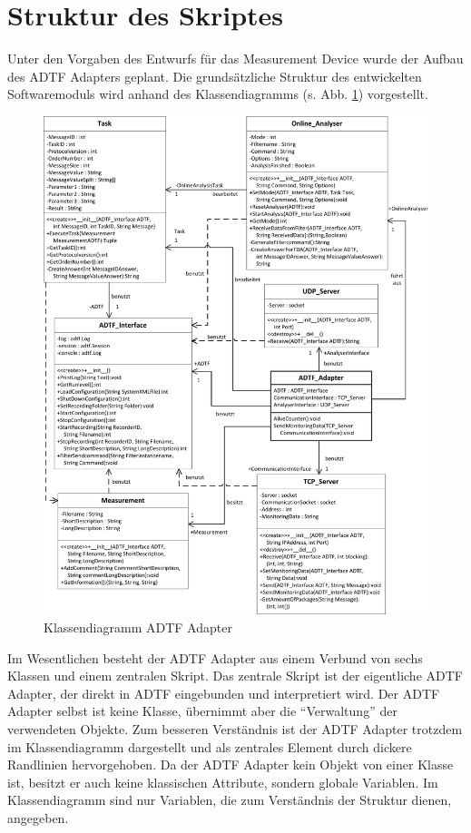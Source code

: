 \documentclass[12pt,a4paper]{report}
\begin{document}
\section{Struktur des Skriptes}\label{sec:Struktur des Skriptes}
Unter den Vorgaben des Entwurfs für das Measurement Device wurde der Aufbau des ADTF Adapters geplant. Die grundsätzliche Struktur des entwickelten Softwaremoduls wird anhand des Klassendiagramms (s. Abb. \ref{pic:Klassendiagramm}) vorgestellt.
\begin{figure}
\begin{center}
\includegraphics[scale=0.85]{Darstellungen/Klassendiagramm}
\caption{Klassendiagramm ADTF Adapter}\label{pic:Klassendiagramm}
\end{center}
\end{figure}
Im Wesentlichen besteht der ADTF Adapter aus einem Verbund von sechs Klassen und einem zentralen Skript. Das zentrale Skript ist der eigentliche ADTF Adapter, der direkt in ADTF eingebunden und interpretiert wird. Der ADTF Adapter selbst ist keine Klasse, übernimmt aber die "`Verwaltung"' der verwendeten Objekte. Zum besseren Verständnis ist der ADTF Adapter trotzdem im Klassendiagramm dargestellt und als zentrales Element durch dickere Randlinien hervorgehoben. Da der ADTF Adapter kein Objekt von einer Klasse ist, besitzt er auch keine klassischen Attribute, sondern globale Variablen. Im Klassendiagramm sind nur Variablen, die zum Verständnis der Struktur dienen, angegeben.
\end{document}
